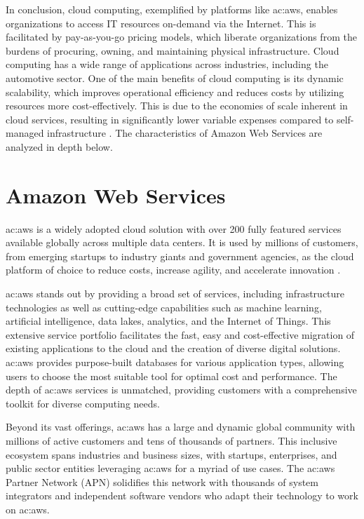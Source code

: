 In conclusion, cloud computing, exemplified by platforms like \gls{ac:aws}, enables organizations to access IT resources on-demand via the Internet. This is facilitated by pay-as-you-go pricing models, which liberate organizations from the burdens of procuring, owning, and maintaining physical infrastructure. Cloud computing has a wide range of applications across industries, including the automotive sector. One of the main benefits of cloud computing is its dynamic scalability, which improves operational efficiency and reduces costs by utilizing resources more cost-effectively. This is due to the economies of scale inherent in cloud services, resulting in significantly lower variable expenses compared to self-managed infrastructure \cite{AWSWhatIsCloudComputing}. The characteristics of Amazon Web Services are analyzed in depth below.

\section{Amazon Web Services}

\gls{ac:aws} is a widely adopted cloud solution with over 200 fully featured services available globally across multiple data centers. It is used by millions of customers, from emerging startups to industry giants and government agencies, as the cloud platform of choice to reduce costs, increase agility, and accelerate innovation \cite{EuAmazonWebServices}.

\gls{ac:aws} stands out by providing a broad set of services, including infrastructure technologies as well as cutting-edge capabilities such as machine learning, artificial intelligence, data lakes, analytics, and the Internet of Things. This extensive service portfolio facilitates the fast, easy and cost-effective migration of existing applications to the cloud and the creation of diverse digital solutions. \gls{ac:aws} provides purpose-built databases for various application types, allowing users to choose the most suitable tool for optimal cost and performance. The depth of \gls{ac:aws} services is unmatched, providing customers with a comprehensive toolkit for diverse computing needs.

Beyond its vast offerings, \gls{ac:aws} has a large and dynamic global community with millions of active customers and tens of thousands of partners. This inclusive ecosystem spans industries and business sizes, with startups, enterprises, and public sector entities leveraging \gls{ac:aws} for a myriad of use cases. The \gls{ac:aws} Partner Network (APN) solidifies this network with thousands of system integrators and independent software vendors who adapt their technology to work on \gls{ac:aws}.

